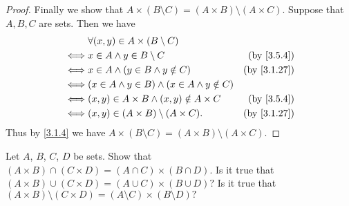 \begin{proof}
  Finally we show that \(A \times (B \setminus C) = (A \times B) \setminus (A \times C)\).
  Suppose that \(A, B, C\) are sets.
  Then we have
  \begin{align*}
         & \forall (x, y) \in A \times (B \setminus C)                                          \\
    \iff & x \in A \land y \in B \setminus C                        & \text{(by \cref{3.5.4})}  \\
    \iff & x \in A \land (y \in B \land y \notin C)                 & \text{(by \cref{3.1.27})} \\
    \iff & (x \in A \land y \in B) \land (x \in A \land y \notin C)                             \\
    \iff & (x, y) \in A \times B \land (x, y) \notin A \times C     & \text{(by \cref{3.5.4})}  \\
    \iff & (x, y) \in (A \times B) \setminus (A \times C).          & \text{(by \cref{3.1.27})}
  \end{align*}
  Thus by \cref{3.1.4} we have \(A \times (B \setminus C) = (A \times B) \setminus (A \times C)\).
\end{proof}

\begin{ex}\label{ex:3.5.5}
  Let \(A\), \(B\), \(C\), \(D\) be sets.
  Show that \((A \times B) \cap (C \times D) = (A \cap C) \times (B \cap D)\).
  Is it true that \((A \times B) \cup (C \times D) = (A \cup C) \times (B \cup D)?\)
  Is it true that \((A \times B) \setminus (C \times D) = (A \setminus C) \times (B \setminus D)?\)
\end{ex}

